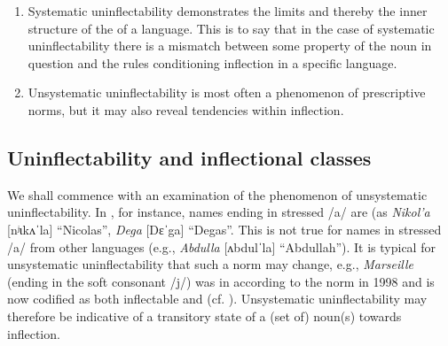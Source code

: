 \documentclass[output=paper,colorlinks,citecolor=brown]{langscibook}
\begin{document}
\begin{enumerate}
	\item Systematic uninflectability demonstrates the limits and thereby the inner structure of the  of a language. This is to say that in the case of systematic uninflectability there is a mismatch between some property of the noun in question and the rules conditioning inflection in a specific language.
	
	\item Unsystematic uninflectability is most often a phenomenon of prescriptive norms, but it may also reveal tendencies within inflection.
\end{enumerate}

\subsection{Uninflectability and inflectional classes}

We shall commence with an examination of the phenomenon of unsystematic uninflectability. In , for instance,  names ending in stressed /a/ are  (as \emph{Nikol'a} [nʲɩkʌˈla] ``Nicolas'', \emph{Dega} [Dɛˈga] ``Degas''. This is not true for names in stressed /a/ from other languages (e.g., \emph{Abdulla} [ʌbdulˈla] ``Abdullah''). It is typical for unsystematic uninflectability that such a norm may change, e.g., \emph{Marseille} (ending in the soft consonant /j/) was  in  according to the norm in 1998 and is now codified as both inflectable and  (cf. \citealt{povazaj1998, povazaj2013}). Unsystematic uninflectability may therefore be indicative of a transitory state of a (set of) noun(s) towards inflection.
\end{document}
